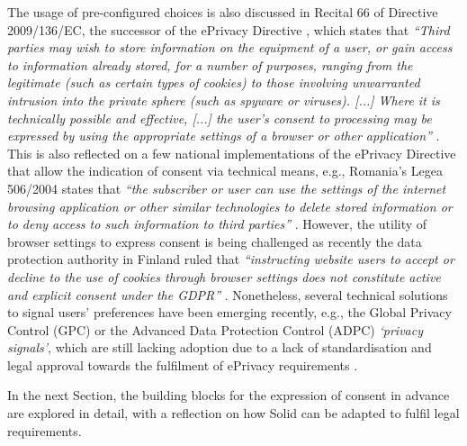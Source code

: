 The usage of pre-configured choices is also discussed in Recital 66 of Directive 2009/136/EC, the successor of the ePrivacy Directive \citeyearpar{noauthor_directive_2002}, which states that \textit{``Third parties may wish to store information on the equipment of a user, or gain access to information already stored, for a number of purposes, ranging from the legitimate (such as certain types of cookies) to those involving unwarranted intrusion into the private sphere (such as spyware or viruses). [...] Where it is technically possible and effective, [...] the user’s consent to processing may be expressed by using the appropriate settings of a browser or other application''} \citeyearpar{noauthor_directive_2009}.
This is also reflected on a few national implementations of the ePrivacy Directive that allow the indication of consent via technical means, e.g., Romania's Legea 506/2004 states that \textit{``the subscriber or user can use the settings of the internet browsing application or other similar technologies to delete stored information or to deny access to such information to third parties''} \citeyearpar{noauthor_legea_2004}.
However, the utility of browser settings to express consent is being challenged as recently the data protection authority in Finland ruled that \textit{``instructing website users to accept or decline to the use of cookies through browser settings does not constitute active and explicit consent under the GDPR''} \citep{fich_finland_2021}.
Nonetheless, several technical solutions to signal users' preferences have been emerging recently, e.g., the Global Privacy Control (GPC) \citep{global_privacy_control_gpc_2021} or the Advanced Data Protection Control (ADPC) \citep{human_advanced_2021} \textit{`privacy signals'}, which are still lacking adoption due to a lack of standardisation and legal approval towards the fulfilment of ePrivacy requirements \citep{santos_how_2023}.

In the next Section, the building blocks for the expression of consent in advance are explored in detail, with a reflection on how Solid can be adapted to fulfil legal requirements. 